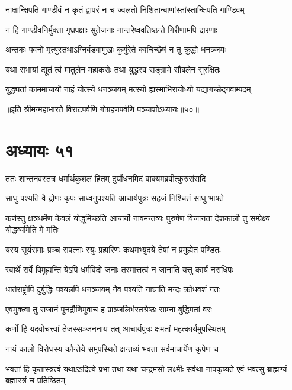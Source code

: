 \twolineshloka
{नाक्षान्क्षिपति गाण्डीवं न कृतं द्वापरं न च}
{ज्वलतो निशितान्बाणांस्तांस्तान्क्षिपति गाण्डिवम्}


\twolineshloka
{न हि गाण्डीवनिर्मुक्ता गृध्रपक्षाः सुतेजनाः}
{नान्तरेष्ववतिष्ठन्ते गिरीणामपि दारणाः}


\twolineshloka
{अन्तकः पवनो मृत्युस्तथाऽग्निर्बडवामुखः}
{कुर्युरेते क्वचिच्छेषं न तु क्रुद्धो धनञ्जयः}


\twolineshloka
{यथा सभायां द्यूतं त्वं मातुलेन महाकरोः}
{तथा युद्धस्व सङ्ग्रामे सौबलेन सुरक्षितः}


\twolineshloka
{युद्ध्यतां काममाचार्यो नाहं योत्स्ये धनञ्जयम्}
{मत्स्यो ह्यस्माभिरायोध्यो यद्यागच्छेद्गवाम्पदम्}

॥इति श्रीमन्महाभारते विराटपर्वणि गोग्रहणपर्वणि पञ्चाशोऽध्यायः॥५०॥

\chapter{अध्यायः ५१}

\twolineshloka
{ततः शान्तनवस्तत्र धर्मार्थकुशलं हितम्}
{दुर्योधनमिदं वाक्यमब्रवीत्कुरुसंसदि}


\twolineshloka
{साधु पश्यति वै द्रोणः कृपः साध्वनुपश्यति}
{आचार्यपुत्रः सहजं निश्चितं साधु भाषते}


\threelineshloka
{कर्णस्तु क्षत्रधर्मेण केवलं योद्धुमिच्छति}
{आचार्यो नावमन्तव्यः पुरुषेण विजानता}
{देशकालौ तु सम्प्रेक्ष्य योद्धव्यमिति मे मतिः}


\twolineshloka
{यस्य सूर्यसमाः प़ञ्च सपत्नाः स्युः प्रहारिणः}
{कथमभ्युदये तेषां न प्रमुह्येत पण्डितः}


\twolineshloka
{स्वार्थे सर्वे विमुह्यन्ति येऽपि धर्मविदो जनाः}
{तस्मात्तत्वं न जानाति यत्तु कार्यं नराधिपः}


\twolineshloka
{धार्तराष्ट्रोपि दुर्बुद्धिः पश्यन्नपि धनञ्जयम्}
{नैव पश्यति नाघ्राति मन्दः क्रोधवशं गतः}



\twolineshloka
{एवमुक्त्वा तु राजानं पुनर्द्रौणिमुवाच ह}
{प्राञ्जलिर्भरतश्रेष्ठः साम्ना बुद्धिमतां वरः}


\twolineshloka
{कर्णो हि यदवोचत्त्वां तेजस्सञ्जननाय तत्}
{आचार्यपुत्रः क्षमतां महत्कार्यमुपस्थितम्}


\twolineshloka
{नायं कालो विरोधस्य कौन्तेये समुपस्थिते}
{क्षन्तव्यं भवता सर्वमाचार्येण कृपेण च}


\threelineshloka
{भवतां हि कृतास्त्रत्वं यथाऽऽदित्ये प्रभा तथा}
{यथा चन्द्रमसो लक्ष्मीः सर्वथा नापकृष्यते}
{एवं भवत्सु ब्राह्मण्यं ब्रह्मास्त्रं च प्रतिष्ठितम्}


